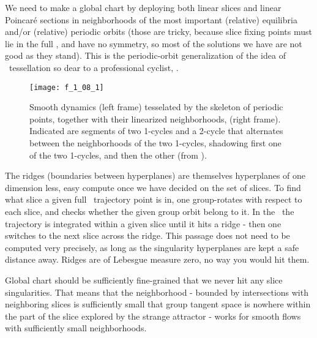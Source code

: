 We need to make a global chart by deploying both linear slices and linear
Poincar\'e sections in neighborhoods of the most important (relative)
equilibria and/or (relative) periodic orbits (those are tricky, because
slice fixing points must lie in the full \statesp, and have no symmetry,
so most of the solutions we have are not good as they stand). This is the
periodic-orbit generalization of the idea of
{\statesp\ tessellation}
so dear to a professional cyclist, .

 \begin{figure}
 \begin{center}
\texttt{[image: f\_1\_08\_1]}
 \end{center}
 \caption{\label{fig:Tesselate}
Smooth dynamics  (left frame) tesselated by the skeleton of
periodic points, together with their linearized neighborhoods,
(right frame).
Indicated are segments of two 1-cycles and a 2-cycle that
alternates between the neighborhoods of the two 1-cycles,
shadowing first one of the two 1-cycles, and then the other
(from \wwwcb{}).
  }\end{figure}
%


The ridges (boundaries
between hyperplanes) are themselves hyperplanes of one dimension less,
easy compute once we have decided on the set of slices. To find
what slice a given full \statesp\ trajectory point is in, one group-rotates
with respect to each slice, and checks whether the given group orbit
belong to it. In the \reducedsp\ the trajectory is integrated within a
given slice until it hits a ridge - then one switches to
the next slice across the ridge. This passage does not need to
be computed very precisely, as long as the singularity
hyperplanes are kept a safe distance away. Ridges are of Lebesgue
measure zero, no
way you would hit them.

Global chart should be sufficiently fine-grained that we never hit any
slice singularities. That means that the neighborhood - bounded by
intersections with neighboring slices is sufficiently small that group
tangent space is nowhere within the part of the slice explored by
the strange attractor - works for smooth flows
with sufficiently small neighborhoods.

